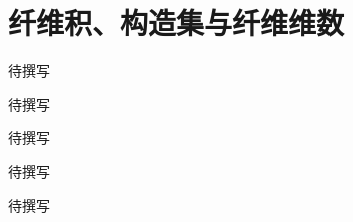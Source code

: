 
% 
% 

\chapter{纤维积、构造集与纤维维数}
\label{g5:ch:11}

\begin{chapterabstract}
待撰写
\end{chapterabstract}

\begin{learninggoals}
待撰写
\end{learninggoals}

待撰写






\begin{chaptersummary}
待撰写
\end{chaptersummary}

\BookExercises
待撰写

